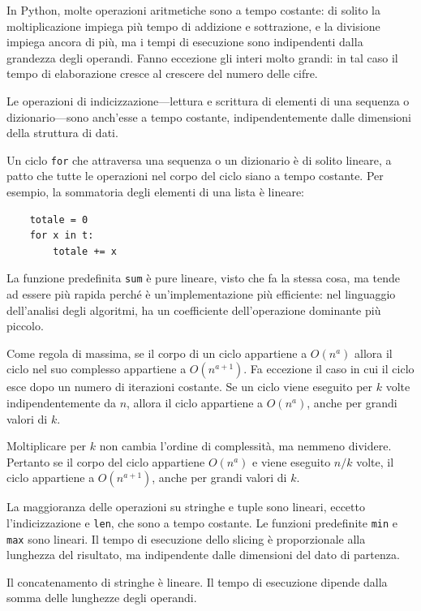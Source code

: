 \documentclass[10pt]{book}
\begin{document}
In Python, molte operazioni aritmetiche sono a tempo costante: di solito la moltiplicazione impiega più tempo di addizione e sottrazione, e la divisione impiega ancora di più, ma i tempi di esecuzione sono indipendenti dalla grandezza degli operandi. Fanno eccezione gli interi molto grandi: in tal caso il tempo di elaborazione cresce al crescere del numero delle cifre.

Le operazioni di indicizzazione---lettura e scrittura di elementi di una sequenza o dizionario---sono anch'esse a tempo costante, indipendentemente dalle dimensioni della struttura di dati.

Un ciclo {\tt for} che attraversa una sequenza o un dizionario è di solito lineare, a patto che tutte le operazioni nel corpo del ciclo siano a tempo costante. Per esempio, la sommatoria degli elementi di una lista è lineare:

\begin{verbatim}
    totale = 0
    for x in t:
        totale += x
\end{verbatim}

La funzione predefinita {\tt sum} è pure lineare, visto che fa la stessa cosa, ma tende ad essere più rapida perché è un'implementazione più efficiente: nel linguaggio dell'analisi degli algoritmi, ha un coefficiente dell'operazione dominante più piccolo.

Come regola di massima, se il corpo di un ciclo appartiene a $O(n^a)$ allora il ciclo nel suo complesso appartiene a $O(n^{a+1})$.  Fa eccezione il caso in cui il ciclo esce dopo un numero di iterazioni costante. Se un ciclo viene eseguito per $k$ volte indipendentemente da $n$, allora il ciclo appartiene a $O(n^a)$, anche per grandi valori di $k$.

Moltiplicare per $k$ non cambia l'ordine di complessità, ma nemmeno dividere. Pertanto se il corpo del ciclo appartiene $O(n^a)$ e viene eseguito
$n/k$ volte, il ciclo appartiene a $O(n^{a+1})$, anche per grandi valori di $k$.

La maggioranza delle operazioni su stringhe e tuple sono lineari, eccetto l'indicizzazione e {\tt len}, che sono a tempo costante. Le funzioni predefinite {\tt min} e {\tt max} sono lineari. Il tempo di esecuzione dello slicing è proporzionale alla lunghezza del risultato, ma indipendente dalle dimensioni del dato di partenza.

Il concatenamento di stringhe è lineare. Il tempo di esecuzione dipende dalla somma delle lunghezze degli operandi.
\end{document}
